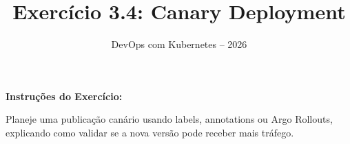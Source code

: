 \documentclass[11pt,a4paper]{article}
\title{\color{secondary}\Huge\textbf{Exercício 3.4: Canary Deployment}}
\author{\color{primary}DevOps com Kubernetes -- 2026}
\date{}
\begin{document}
\maketitle


\textbf{Instruções do Exercício:}

\begin{tcolorbox}[colback=blue!5!white,colframe=blue!75!black]
Planeje uma publicação canário usando labels, annotations ou Argo Rollouts, explicando como validar se a nova versão pode receber mais tráfego.
\end{tcolorbox}
\end{document}
